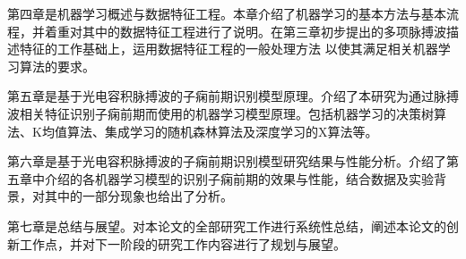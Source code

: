第四章是机器学习概述与数据特征工程。本章介绍了机器学习的基本方法与基本流程，并着重对其中的数据特征工程进行了说明。在第三章初步提出的多项脉搏波描述特征的工作基础上，运用数据特征工程的一般处理方法
以使其满足相关机器学习算法的要求。

第五章是基于光电容积脉搏波的子痫前期识别模型原理。介绍了本研究为通过脉搏波相关特征识别子痫前期而使用的机器学习模型原理。包括机器学习的决策树算法、K均值算法、集成学习的随机森林算法及深度学习的X算法等。

第六章是基于光电容积脉搏波的子痫前期识别模型研究结果与性能分析。介绍了第五章中介绍的各机器学习模型的识别子痫前期的效果与性能，结合数据及实验背景，对其中的一部分现象也给出了分析。

第七章是总结与展望。对本论文的全部研究工作进行系统性总结，阐述本论文的创新工作点，并对下一阶段的研究工作内容进行了规划与展望。
